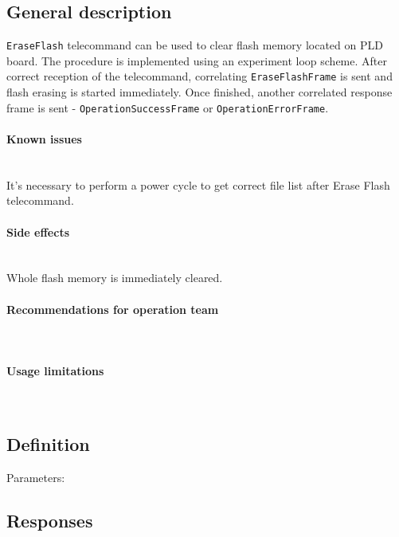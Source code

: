 

\subsection{General description}
\texttt{EraseFlash} telecommand can be used to clear \OBC flash memory located on PLD board. The procedure is implemented using an experiment loop scheme. After correct reception of the telecommand, correlating \texttt{EraseFlashFrame} is sent and flash erasing is started immediately. Once finished, another correlated response frame is sent - \texttt{OperationSuccessFrame} or \texttt{OperationErrorFrame}.

\paragraph{Known issues} \mbox{} \\
It's necessary to perform a power cycle to get correct file list after Erase Flash telecommand.

\paragraph{Side effects} \mbox{} \\
Whole flash memory is immediately cleared.

\paragraph{Recommendations for operation team} \mbox{} \\
\None

\paragraph{Usage limitations} \mbox{} \\ 
\None

\subsection{Definition}

Parameters: 

\begin{tcarglist}
\end{tcarglist}

\subsection{Responses}
